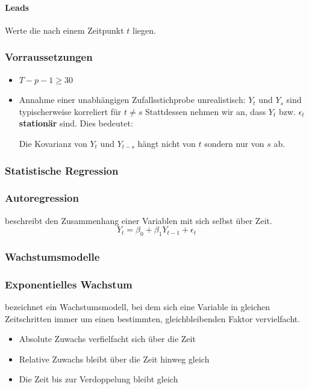\documentclass[a3paper, 8pt]{extarticle}
\begin{document}
\begin{multicols*}{5}
\begin{enumerate}
\paragraph{Leads} Werte die nach einem Zeitpunkt $t$ liegen.

\subsubsection{Vorraussetzungen}
\begin{itemize}
    \item $T-p-1 \geq 30$
    \item Annahme einer unabhängigen Zufallsstichprobe unrealistisch: $Y_t$ und $Y_s$ sind typischerweise korreliert für $t \neq s$ Stattdessen nehmen wir an, dass $Y_t$ bzw. $\epsilon_t$ \textbf{stationär} sind. Dies bedeutet:
    
    Die Kovarianz von $Y_t$ und $Y_{t-s}$ hängt nicht von $t$ sondern nur von $s$ ab.
\end{itemize}

\subsubsection{Statistische Regression}

\subsubsection{Autoregression} beschreibt den Zusammenhang einer Variablen mit sich selbst über Zeit. $$Y_t= \beta_0+\beta_1 Y_{t-1}+ \epsilon_t$$

\subsubsection{Wachstumsmodelle}

\subsubsection{Exponentielles Wachstum}
bezeichnet ein Wachstumsmodell, bei dem sich eine Variable in gleichen Zeitschritten immer um einen bestimmten, gleichbleibenden Faktor vervielfacht. \begin{itemize}
    \item Absolute Zuwachs verfielfacht sich über die Zeit
    \item Relative Zuwachs bleibt über die Zeit hinweg gleich
    \item Die Zeit bis zur Verdoppelung bleibt gleich
\end{itemize}


\end{enumerate}
\end{multicols*}
\end{document}
